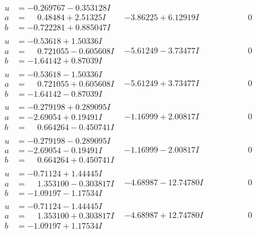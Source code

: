 \documentclass[1p]{elsarticle_modified}
\theoremstyle{definition}
\begin{document}
$$\begin{array}{c|c|c}
\begin{aligned}
u &= -0.269767 - 0.353128 I \\
a &= \phantom{-}0.48484 + 2.51325 I \\
b &= -0.722281 + 0.885047 I\end{aligned}
 & -3.86225 + 6.12919 I & \phantom{-0.000000 } 0 \\ \hline\begin{aligned}
u &= -0.53618 + 1.50336 I \\
a &= \phantom{-}0.721055 - 0.605608 I \\
b &= -1.64142 + 0.87039 I\end{aligned}
 & -5.61249 - 3.73477 I & \phantom{-0.000000 } 0 \\ \hline\begin{aligned}
u &= -0.53618 - 1.50336 I \\
a &= \phantom{-}0.721055 + 0.605608 I \\
b &= -1.64142 - 0.87039 I\end{aligned}
 & -5.61249 + 3.73477 I & \phantom{-0.000000 } 0 \\ \hline\begin{aligned}
u &= -0.279198 + 0.289095 I \\
a &= -2.69054 + 0.19491 I \\
b &= \phantom{-}0.664264 - 0.450741 I\end{aligned}
 & -1.16999 + 2.00817 I & \phantom{-0.000000 } 0 \\ \hline\begin{aligned}
u &= -0.279198 - 0.289095 I \\
a &= -2.69054 - 0.19491 I \\
b &= \phantom{-}0.664264 + 0.450741 I\end{aligned}
 & -1.16999 - 2.00817 I & \phantom{-0.000000 } 0 \\ \hline\begin{aligned}
u &= -0.71124 + 1.44445 I \\
a &= \phantom{-}1.353100 - 0.303817 I \\
b &= -1.09197 - 1.17534 I\end{aligned}
 & -4.68987 - 12.74780 I & \phantom{-0.000000 } 0 \\ \hline\begin{aligned}
u &= -0.71124 - 1.44445 I \\
a &= \phantom{-}1.353100 + 0.303817 I \\
b &= -1.09197 + 1.17534 I\end{aligned}
 & -4.68987 + 12.74780 I & \phantom{-0.000000 } 0 \\ \hline\begin{aligned}

\end{aligned}
\end{array}$$
\end{document}
